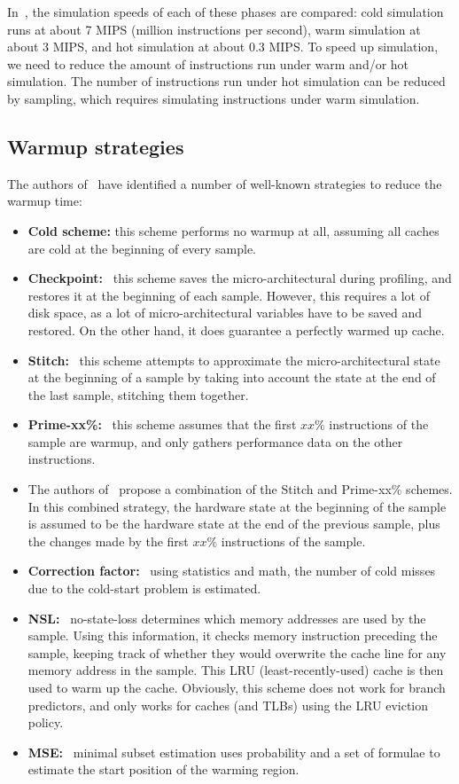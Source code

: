 In~\cite{simplescalar}, the simulation speeds of each of these phases are compared: cold simulation runs at about 7 MIPS (million instructions per second), warm simulation at about 3 MIPS, and hot simulation at about 0.3 MIPS.
To speed up simulation, we need to reduce the amount of instructions run under warm and/or hot simulation.
The number of instructions run under hot simulation can be reduced by sampling, which requires simulating instructions under warm simulation.

\subsection{Warmup strategies}\label{subsec:warmup-strategies}
The authors of~\cite{blrl} have identified a number of well-known strategies to reduce the warmup time:
\begin{itemize}
    \item \textbf{Cold scheme:} this scheme performs no warmup at all, assuming all caches are cold at the beginning of every sample.
    \item \textbf{Checkpoint:}~\cite{cpu-checkpoint} this scheme saves the micro-architectural during profiling, and restores it at the beginning of each sample.
    However, this requires a lot of disk space, as a lot of micro-architectural variables have to be saved and restored.
    On the other hand, it does guarantee a perfectly warmed up cache.
    \item \textbf{Stitch:}~\cite{cpu-stitch-prime} this scheme attempts to approximate the micro-architectural state at the beginning of a sample by taking into account the state at the end of the last sample, stitching them together.
    \item \textbf{Prime-xx\%:}~\cite{cpu-stitch-prime} this scheme assumes that the first $xx\%$ instructions of the sample are warmup, and only gathers performance data on the other instructions.
    \item The authors of~\cite{cpu-merge-stitch-prime} propose a combination of the Stitch and Prime-xx\% schemes.
    In this combined strategy, the hardware state at the beginning of the sample is assumed to be the hardware state at the end of the previous sample, plus the changes made by the first $xx\%$ instructions of the sample.
    \item \textbf{Correction factor:}~\cite{cpu-stitch-prime,cpu-corr-fac} using statistics and math, the number of cold misses due to the cold-start problem is estimated.
    \item \textbf{NSL:}~\cite{cpu-nsl} no-state-loss determines which memory addresses are used by the sample.
    Using this information, it checks memory instruction preceding the sample, keeping track of whether they would overwrite the cache line for any memory address in the sample.
    This LRU (least-recently-used) cache is then used to warm up the cache.
    Obviously, this scheme does not work for branch predictors, and only works for caches (and TLBs) using the LRU eviction policy.
    \item \textbf{MSE:}~\cite{cpu-mse} minimal subset estimation uses probability and a set of formulae to estimate the start position of the warming region.
\end{itemize}

